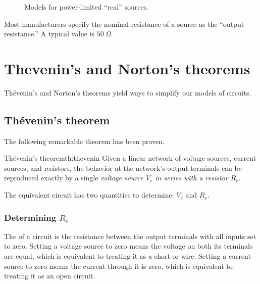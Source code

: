 \documentclass[electronics.tex]{subfiles}
\begin{document}
\begin{figure}[b]%
  \centering
  \qquad
  \caption{Models for power-limited ``real'' sources.}%
  \label{fig:real_sources}%
\end{figure}

Most manufacturers specify the nominal resistance of a source as the ``output resistance.''
A typical value is $50\ \Omega$.
\section{Thevenin's and Norton's theorems}
\tags{}

Th\'evenin's and Norton's theorems yield ways to simplify our models of circuits.
\tags{}

\subsection{Th\'evenin's theorem}
\tags{}

The following remarkable theorem has been proven.
\tags{}

\begin{Theorem}{Th\'evenin's theorem}{th:thevenin}
  Given a linear network of voltage sources, current sources, and resistors, the behavior at the network's output terminals can be reproduced exactly by a single \emph{voltage source $V_e$ in series with a resistor $R_e$}.
\end{Theorem}

The equivalent circuit has two quantities to determine: $V_e$ and $R_e$.

\subsubsection{Determining $R_e$}

The  of a circuit is the resistance between the output terminals with all inputs set to zero.
Setting a voltage source to zero means the voltage on both its terminals are equal, which is equivalent to treating it as a short or wire.
Setting a current source to zero means the current through it is zero, which is equivalent to treating it as an open circuit.
\end{document}
